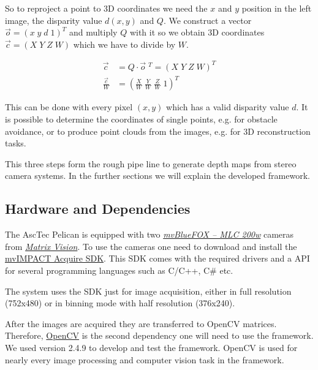 \documentclass[11pt]{article}
\begin{document}
So to reproject a point to 3D coordinates we need the $x$ and $y$ position in the left image, the disparity value $d(x,y)$ and $Q$. We construct a vector $\vec{o}=(x\;y\;d\;1)^T$ and multiply $Q$ with it so we obtain 3D coordinates $\vec{c}=(X\;Y\;Z\;W)$ which we have to divide by $W$.

\begin{align*}
	\vec{c}&=Q\cdot \vec{o}\;^T = (X\;Y\;Z\;W)^T\\
	\frac{\vec{c}}{W}&=\left(\frac{X}{W}\;\frac{Y}{W}\;\frac{Z}{W}\;1\right)^T
\end{align*}

This can be done with every pixel $(x,y)$ which has a valid disparity value $d$. It is possible to determine the coordinates of single points, e.g. for obstacle avoidance, or to produce point clouds from the images, e.g. for 3D reconstruction tasks.


\bigskip This three steps form the rough pipe line to generate depth maps from stereo camera systems. In the further sections we will explain the developed framework.

\subsection{Hardware and Dependencies}  
The AscTec Pelican is equipped with two  \emph{\href{http://www.matrix-vision.com/USB2.0-single-board-camera-mvbluefox-mlc.html?camera=mvBlueFOX-MLC200wC&selectInterface=Alle&selectMpixels=Alle&selectFps=Alle&selectSensor=Alle&selectColor=Alle&selectSize=Alle&selectShutter=Alle&selectModel=Alle&col=1&row=0}{mvBlueFOX -- MLC 200w}} cameras from \emph{\href{http://www.matrix-vision.com/home-en.html}{Matrix Vision}}. To use the cameras one need to download and install the \href{http://www.matrix-vision.com/programming-interface-mvimpact-acquire.html}{mvIMPACT Acquire SDK}. This SDK comes with the required drivers and a API for several programming languages such as C/C++, C\# etc. 

The system uses the SDK just for image acquisition, either in full resolution (752x480) or in binning mode with half resolution (376x240).

After the images are acquired they are transferred to OpenCV matrices. Therefore, \href{http://opencv.org/}{OpenCV} is the second dependency one will need to use the framework. We used version 2.4.9 to develop and test the framework. OpenCV is used for nearly every image processing and computer vision task in the framework.
\end{document}
